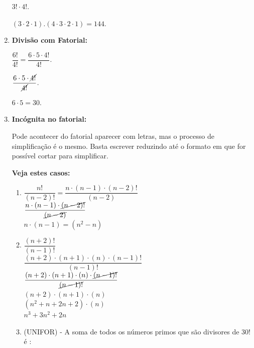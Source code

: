 \begin{multicols*}{2}
\begin{enumerate}
		      {$ 3! \cdot 4! $}.

		      {$ (3 \cdot 2 \cdot 1) . ( 4 \cdot 3 \cdot2 \cdot1) = 144 $}.

		\item \textbf{Divisão com Fatorial:}

		      {$ \dfrac{6!}{4!} = \dfrac{6 \cdot 5 \cdot 4!}{4!}$}.

		      {$ \dfrac{6 \cdot 5 \cdot \cancel{4!}}{\cancel{4!}} $}.

		      {$ 6 \cdot 5 = 30 $}.

		\item \textbf{Incógnita no fatorial:}

		      Pode acontecer do fatorial aparecer com letras, mas o processo de simplificação é o mesmo. Basta escrever reduzindo até o formato em que for possível cortar para simplificar.

		      \textbf{Veja estes casos:}

		      \begin{enumerate}

			      \item 	{$ \dfrac{n!}{(n - 2)!} = \dfrac{n \cdot (n - 1) \cdot ( n - 2)!}{(n - 2)} $}\\

			            {$ \dfrac{n \cdot (n - 1) \cdot \cancel{( n - 2)!}}{\cancel{(n - 2)}} $}\\

			            {$  {n \cdot (n - 1)} = (n^2 - n) $}\\

			      \item 	{$ \dfrac{(n + 2)!}{(n - 1)!} $}\\

			            {$ \dfrac{(n + 2) \cdot (n + 1) \cdot (n) \cdot (n - 1)!}{(n - 1)!} $}\\

			            {$ \dfrac{(n + 2) \cdot (n + 1) \cdot (n) \cdot \cancel{(n - 1)!}}{\cancel{(n - 1)!}} $}\\

			            {$(n + 2) \cdot (n + 1) \cdot (n) $}\\

			            {$(n^2 + n + 2n + 2) \cdot (n) $}\\

			            {$n^3 + 3 n^2 + 2n $}

			      \item (UNIFOR) - A soma de todos os números primos que são divisores de 30! é :


\end{enumerate}
\end{enumerate}
\end{multicols*}
